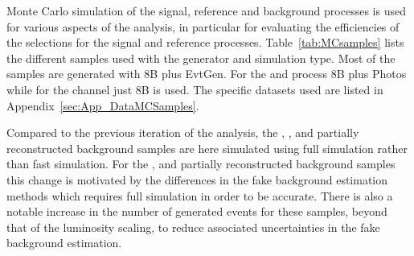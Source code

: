 Monte Carlo simulation of the signal, reference and background processes is used for various aspects of the analysis, in particular for evaluating the efficiencies of the selections for the signal and reference processes.
Table~\ref{tab:MCsamples} lists the different samples used with the generator and simulation type. 
Most of the samples are generated with \Pythia8B plus EvtGen.
For the \BsJpsiPhi and \bbJpsiX process \Pythia8B plus Photos while for the \Bhh channel just \Pythia8B is used.   
The specific datasets used are listed in Appendix~\ref{sec:App_DataMCSamples}.

Compared to the previous iteration of the analysis, the \BpmKpmJpsi, \BpmPipmJpsi, \BsJpsiPhi and partially reconstructed background samples are here simulated using full simulation rather than fast simulation. 
For the \BpmKpmJpsi, \BpmPipmJpsi and partially reconstructed background samples this change is motivated by the differences in the fake background estimation methods which requires full simulation in order to be accurate. 
There is also a notable increase in the number of generated events for these samples, beyond that of the luminosity scaling, to reduce associated uncertainties in the fake background estimation. 

